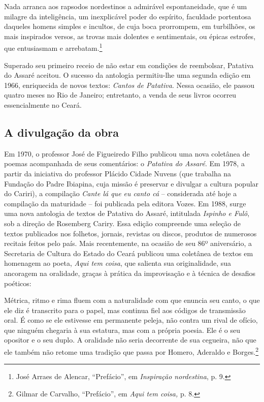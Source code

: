 \begin{hedraquote}
Nada arranca aos rapsodos nordestinos a admirável
espontaneidade, que é um milagre da inteligência, um inexplicável poder do
espírito, faculdade portentosa daqueles homens simples e incultos, de cuja boca
prorrompem, em turbilhões, os mais inspirados versos, as trovas mais dolentes e
sentimentais, ou épicas estrofes, que entusiasmam e arrebatam.\footnote{ José
Arraes de Alencar, “Prefácio”, em \textit{Inspiração nordestina}, p. 9.}
\end{hedraquote}

\noindent Superado seu primeiro receio de não estar em condições de reembolsar, Patativa
do Assaré aceitou. O sucesso da antologia permitiu-lhe uma segunda edição em
1966, enriquecida de novos textos: \textit{Cantos de Patativa}. Nessa ocasião, ele passou
quatro meses no Rio de Janeiro; entretanto, a venda de seus livros ocorreu
essencialmente no Ceará.

\subsection{A divulgação da obra}

Em 1970, o professor José de Figueiredo Filho publicou uma nova coletânea de
poemas acompanhada de seus comentários: o \textit{Patativa do Assaré}. Em 1978, a partir
da iniciativa do professor Plácido Cidade Nuvens (que trabalha na Fundação do
Padre Ibiapina, cuja missão é preservar e divulgar a cultura popular do Cariri),
a compilação \textit{Cante lá que eu canto cá} -- considerada até hoje a compilação da
maturidade -- foi publicada pela editora Vozes. Em 1988, surge uma nova
antologia de textos de Patativa do Assaré, intitulada \textit{Ispinho e Fulô}, sob a
direção de Rosemberg Cariry. Essa edição compreende uma seleção de textos
publicados nos folhetos, jornais, revistas ou discos, produtos de numerosos
recitais feitos pelo país. Mais recentemente, na ocasião de seu 86º aniversário,
a Secretaria de Cultura do Estado do Ceará publicou uma coletânea de textos em
homenagem ao poeta, \textit{Aqui tem coisa}, que salienta sua originalidade, sua
ancoragem na oralidade, graças à prática da improvisação e à técnica de desafios
poéticos:

\begin{hedraquote}
Métrica, ritmo e rima fluem com a naturalidade com que enuncia seu
canto, o que ele diz é transcrito para o papel, mas continua fiel aos códigos de
transmissão oral. É como se ele estivesse em permanente peleja, não contra um
rival de ofício, que ninguém chegaria à sua estatura, mas com a própria poesia.
Ele é o seu opositor e o seu duplo. A oralidade não seria decorrente de sua
cegueira, não que ele também não retome uma tradição que passa por Homero,
Aderaldo e Borges.\footnote{ Gilmar de Carvalho, “Prefácio”, em \textit{Aqui tem
coisa,} p. 8.}
\end{hedraquote}

